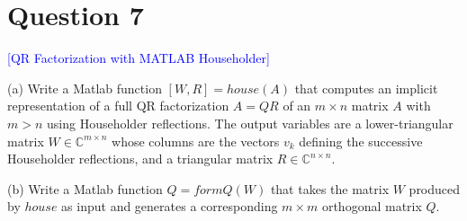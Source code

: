 \section*{Question 7}
\textcolor{blue}{[QR Factorization with MATLAB Householder]} 

(a) Write a Matlab function $[W,R] = house(A)$ that computes an implicit representation of a full QR factorization 
$A = QR$ of an $m \times n$ matrix $A$ with $m > n$ using Householder reflections. 
The output variables are a lower-triangular matrix $W \in \mathbb{C}^{m \times n}$ 
whose columns are the vectors $v_k$ defining the successive Householder reflections, 
and a triangular matrix $R \in \mathbb{C}^{n \times n}$.

(b) Write a Matlab function $Q = formQ(W)$ that takes 
the matrix $W$ produced by $house$ as input 
and generates a corresponding $m \times m$ orthogonal matrix $Q$.
